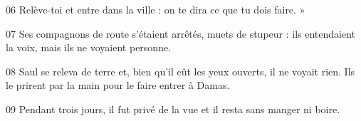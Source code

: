 
06 Relève-toi et entre dans la ville : on te dira ce que tu dois faire. »

07 Ses compagnons de route s’étaient arrêtés, muets de stupeur : ils entendaient la voix, mais ils ne voyaient personne.

08 Saul se releva de terre et, bien qu’il eût les yeux ouverts, il ne voyait rien. Ils le prirent par la main pour le faire entrer à Damas.

09 Pendant trois jours, il fut privé de la vue et il resta sans manger ni boire.
